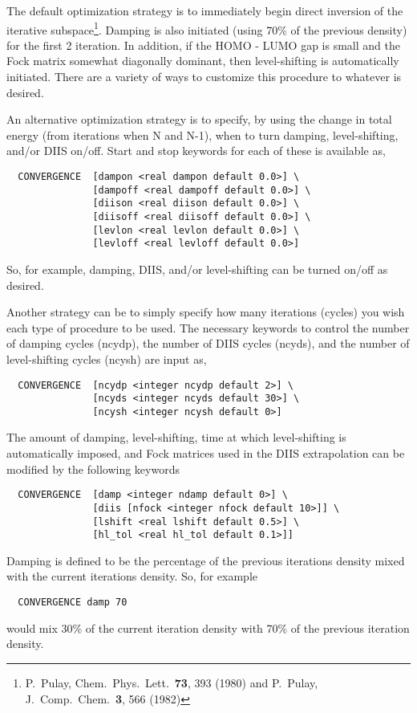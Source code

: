 The default optimization strategy is to immediately begin direct
inversion of the iterative subspace\footnote {P.~Pulay, Chem.\ Phys.\ 
  Lett.\ {\bf 73}, 393 (1980) and P.~Pulay, J.~Comp.~Chem.~{\bf 3},
  566 (1982)}.  Damping is also initiated (using 70\% of the previous
density) for the first 2 iteration.  In addition, if the HOMO - LUMO
gap is small and the Fock matrix somewhat diagonally dominant, then
level-shifting is automatically initiated.  There are a variety of ways
to customize this procedure to whatever is desired.

An alternative optimization strategy is to specify, by using the change 
in total energy (from iterations when N and N-1), when to turn
damping, level-shifting, and/or DIIS on/off.  Start and stop keywords for
each of these is available as,
\begin{verbatim}
  CONVERGENCE  [dampon <real dampon default 0.0>] \
               [dampoff <real dampoff default 0.0>] \
               [diison <real diison default 0.0>] \
               [diisoff <real diisoff default 0.0>] \
               [levlon <real levlon default 0.0>] \
               [levloff <real levloff default 0.0>]
\end{verbatim}

So, for example, damping, DIIS, and/or level-shifting can be turned
on/off as desired.

Another strategy can be to simply specify how many iterations (cycles) you wish
each type of procedure to be used.  The necessary keywords to control
the number of damping cycles (ncydp), the number of DIIS cycles
(ncyds), and the number of level-shifting cycles (ncysh) are input as,
\begin{verbatim}
  CONVERGENCE  [ncydp <integer ncydp default 2>] \
               [ncyds <integer ncyds default 30>] \
               [ncysh <integer ncysh default 0>]
\end{verbatim}

The amount of damping, level-shifting, time at which level-shifting is
automatically imposed, and Fock matrices used in the DIIS
extrapolation can be modified by the following keywords
\begin{verbatim}
  CONVERGENCE  [damp <integer ndamp default 0>] \
               [diis [nfock <integer nfock default 10>]] \
               [lshift <real lshift default 0.5>] \
               [hl_tol <real hl_tol default 0.1>]]
\end{verbatim}

Damping is defined to be the percentage of the previous iterations
density mixed with the current iterations density.  So, for example 
\begin{verbatim}
  CONVERGENCE damp 70
\end{verbatim}
would mix 30\% of the current iteration density with 70\% of the
previous iteration density.

